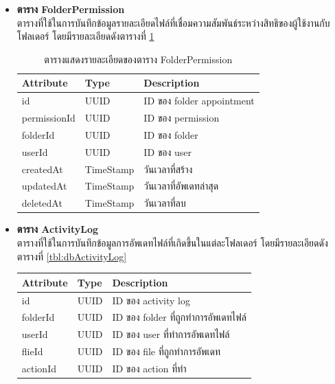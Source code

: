 \documentclass[12pt,oneside,openright,a4paper]{cpe-thai-project}
\begin{document}
\begin{itemize}
\item \textbf{ตาราง FolderPermission}\\
ตารางที่ใช้ในการบันทึกข้อมูลรายละเอียดไฟล์ที่เชื่อมความสัมพันธ์ระหว่างสิทธิของผู้ใช้งานกับโฟลเดอร์ โดยมีรายละเอียดดังตารางที่ \ref{tbl:dbFolderPermission}
\begin{table}[!ht]
    \centering
    \begin{tabular}{|p{4cm}|p{2cm}|p{6cm}|}
    \hline
    \textbf{Attribute} & \textbf{Type} & \textbf{Description}   \\ \hline
    id           & UUID      & ID ของ folder appointment \\ \hline
    permissionId & UUID      & ID ของ permission         \\ \hline
    folderId     & UUID      & ID ของ folder             \\ \hline
    userId       & UUID      & ID ของ user               \\ \hline
    createdAt    & TimeStamp & วันเวลาที่สร้าง           \\ \hline
    updatedAt    & TimeStamp & วันเวลาที่อัพเดทล่าสุด    \\ \hline
    deletedAt    & TimeStamp & วันเวลาที่ลบ            \\ \hline
    \end{tabular}
    \caption{\centering  ตารางแสดงรายละเอียดของตาราง FolderPermission} \label{tbl:dbFolderPermission}
\end{table}
\newpage
\item \textbf{ตาราง ActivityLog}\\
ตารางที่ใช้ในการบันทึกข้อมูลการอัพเดทไฟล์ที่เกิดขึ้นในแต่ละโฟลเดอร์ โดยมีรายละเอียดดังตารางที่ \ref{tbl:dbActivityLog}
\begin{table}[!ht]
    \centering
    \begin{tabular}{|p{4cm}|p{2cm}|p{6cm}|}
    \hline
    \textbf{Attribute} & \textbf{Type} & \textbf{Description}   \\ \hline
    id        & UUID      & ID ของ activity log                 \\ \hline
    folderId  & UUID      & ID ของ folder ที่ถูกทำการอัพเดทไฟล์ \\ \hline
    userId    & UUID      & ID ของ user ที่ทำการอัพเดทไฟล์      \\ \hline
    flieId    & UUID      & ID ของ file ที่ถูกทำการอัพเดท       \\ \hline
    actionId  & UUID      & ID ของ action ที่ทำ                 \\ \hline

\end{tabular}
\end{table}
\end{itemize}
\end{document}
